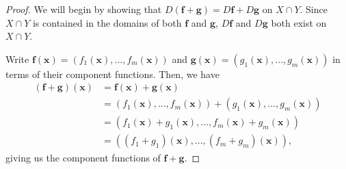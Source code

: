 \documentclass{ximera}
\begin{document}
\begin{proof}
We will begin by showing that $D(\mathbf{f}+\mathbf{g}) = D\mathbf{f}+D\mathbf{g}$ on $X\cap Y$. Since $X\cap Y$ is contained in the domains of both $\mathbf{f}$ and $\mathbf{g}$, $D\mathbf{f}$ and $D\mathbf{g}$ both exist on $X\cap Y$.

Write $\mathbf{f}(\mathbf{x}) = (f_1(\mathbf{x}),...,f_m(\mathbf{x}))$ and $\mathbf{g}(\mathbf{x}) = (g_1(\mathbf{x}),...,g_m(\mathbf{x}))$ in terms of their component functions. Then, we have
\begin{align*}
(\mathbf{f}+\mathbf{g})(\mathbf{x}) &= \mathbf{f}(\mathbf{x})+\mathbf{g}(\mathbf{x})\\
&= (f_1(\mathbf{x}),...,f_m(\mathbf{x})) + (g_1(\mathbf{x}),...,g_m(\mathbf{x}))\\
&= (f_1(\mathbf{x})+g_1(\mathbf{x}),...,f_m(\mathbf{x})+g_m(\mathbf{x}))\\
&= ((f_1+g_1)(\mathbf{x}),...,(f_m+g_m)(\mathbf{x})),
\end{align*}
giving us the component functions of $\mathbf{f}+\mathbf{g}$.


\end{proof}
\end{document}
